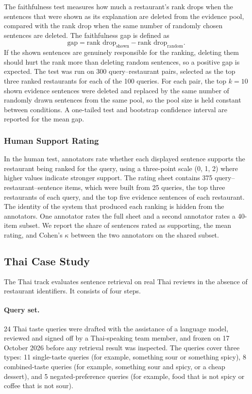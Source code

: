 The faithfulness test measures how much a restaurant's rank drops when the sentences that were shown as its explanation are deleted from the evidence pool, compared with the rank drop when the same number of randomly chosen sentences are deleted. The faithfulness gap is defined as
\begin{equation}
\text{gap}=\text{rank drop}_{\text{shown}}-\text{rank drop}_{\text{random}}.
\end{equation}
If the shown sentences are genuinely responsible for the ranking, deleting them should hurt the rank more than deleting random sentences, so a positive gap is expected. The test was run on 300 query--restaurant pairs, selected as the top three ranked restaurants for each of the 100 queries. For each pair, the top $k=10$ shown evidence sentences were deleted and replaced by the same number of randomly drawn sentences from the same pool, so the pool size is held constant between conditions. A one-tailed test and bootstrap confidence interval are reported for the mean gap.

\subsubsection{Human Support Rating}
\label{sec:b2design}

In the human test, annotators rate whether each displayed sentence supports the restaurant being ranked for the query, using a three-point scale (0, 1, 2) where higher values indicate stronger support. The rating sheet contains 375 query--restaurant--sentence items, which were built from 25 queries, the top three restaurants of each query, and the top five evidence sentences of each restaurant. The identity of the system that produced each ranking is hidden from the annotators. One annotator rates the full sheet and a second annotator rates a 40-item subset. We report the share of sentences rated as supporting, the mean rating, and Cohen's $\kappa$ between the two annotators on the shared subset.

\subsection{Thai Case Study}
\label{sec:thaieval}

The Thai track evaluates sentence retrieval on real Thai reviews in the absence of restaurant identifiers. It consists of four steps.

\paragraph{Query set.} 24 Thai taste queries were drafted with the assistance of a language model, reviewed and signed off by a Thai-speaking team member, and frozen on 17 October 2026 before any retrieval result was inspected. The queries cover three types: 11 single-taste queries (for example, something sour or something spicy), 8 combined-taste queries (for example, something sour and spicy, or a cheap dessert), and 5 negated-preference queries (for example, food that is not spicy or coffee that is not sour).

